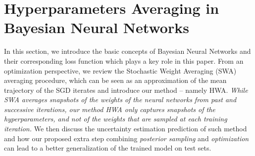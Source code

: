\documentclass[tablecaption=bottom,wcp]{jmlr} %
\begin{document}
\section{Hyperparameters Averaging in Bayesian Neural Networks}\label{sec:main}

In this section, we introduce the basic concepts of Bayesian Neural Networks and their corresponding loss function which plays a key role in this paper.
From an optimization perspective, we review the Stochastic Weight Averaging (SWA)~\citep{izmailov2018averaging} averaging procedure, which can be seen as an approximation of the mean trajectory of the SGD iterates and introduce our method -- namely \textsc{HWA}.
\textit{While SWA averages snapshots of the weights of the neural networks from past and successive iterations, our method HWA only captures snapshots of the hyperparameters, and not of the weights that are sampled at each training iteration.}
We then discuss the uncertainty estimation prediction of such method and how our proposed extra step combining \emph{posterior sampling} and \emph{optimization} can lead to a better generalization of the trained model on test sets.
\end{document}
